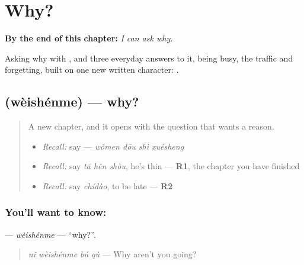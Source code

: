 
\chapter{Why?}
\label{ch:zh-why}

\begin{chapteropening}
\textbf{By the end of this chapter:} \emph{I can ask why.}

Asking why with , and three everyday answers to it, being busy, the traffic and forgetting, built on one new written character: .
\end{chapteropening}

\section[\texorpdfstring{\zh{为什么} (wèishénme)}{为什么 (wèishénme)}]{ (wèishénme) — why?}

\label{lesson:ZH-C95-weishenme}



\begin{quote}
A new chapter, and it opens with the question that wants a reason.

\begin{itemize}
\raggedright
  \item \emph{Recall:} say  — \emph{wǒmen dōu shì xuésheng}
  \item \emph{Recall:} say \emph{tā hěn shòu}, he's thin — \textbf{R1}, the chapter you have finished
  \item \emph{Recall:} say \emph{chídào}, to be late — \textbf{R2}
\end{itemize}
\end{quote}

\subsection*{You'll want to know: }
\textbf{} — \emph{wèishénme} — \textquotedblleft{}why?\textquotedblright{}.

\begin{quote}
\textbf{} \emph{nǐ wèishénme bú qù} — Why aren't you going?
\end{quote}

